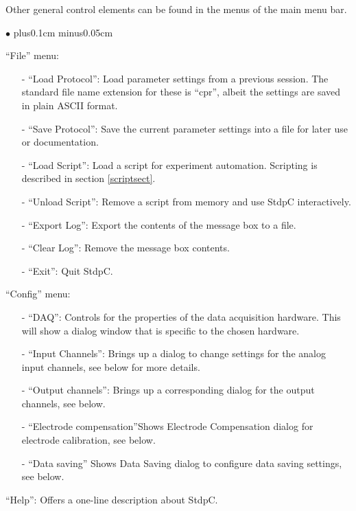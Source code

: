 \documentclass{article}
\newenvironment{myitem}{\begin{list}{$\bullet$}{\setlength{\leftmargin}{1.1em}
\itemsep0.1cm plus0.1cm minus0.05cm
\listparindent0cm
\addtolength{\labelsep}{0.5\labelsep}
\setlength{\labelwidth}{0.8em}
\setlength{\leftmargin}{\labelwidth}
\addtolength{\leftmargin}{\labelsep}
}}{\end{list}}
\begin{document}
Other general control elements can be found in the menus of the main
menu bar. 
\begin{myitem}
\item ``File'' menu:
\
\begin{itemize}
\item[-] ``Load Protocol'': Load parameter settings from a previous
  session. The standard file name extension for these is ``cpr'',
  albeit the settings are saved in plain ASCII format.
\item[-] ``Save Protocol'': Save the current parameter settings into a
  file for later use or documentation.
 \item[-] ``Load Script'': Load a script for experiment
   automation. Scripting is described in section \ref{scriptsect}.
\item[-] ``Unload Script'': Remove a script from memory and use StdpC
  interactively.
\item[-] ``Export Log'': Export the contents of the message box to a
  file.
\item[-] ``Clear Log'': Remove the message box contents.
\item[-] ``Exit'': Quit StdpC.
\end{itemize}
\item ``Config'' menu:
\begin{itemize}
\item[-] ``DAQ'': Controls for the properties of the data acquisition
  hardware. This will show a dialog window that is specific to the
  chosen hardware.
\item[-] ``Input Channels'': Brings up a dialog to change settings for
  the analog input channels, see below for more details.
\item[-] ``Output channels'': Brings up a corresponding dialog for the
  output channels, see below.
\item[-] ``Electrode compensation''Shows Electrode Compensation dialog
 for electrode calibration, see below.
\item[-] ``Data saving'' Shows Data Saving dialog to configure data saving
  settings, see below.
\end{itemize}
\item ``Help'': Offers a one-line description about StdpC. 
\end{myitem}
\end{document}
